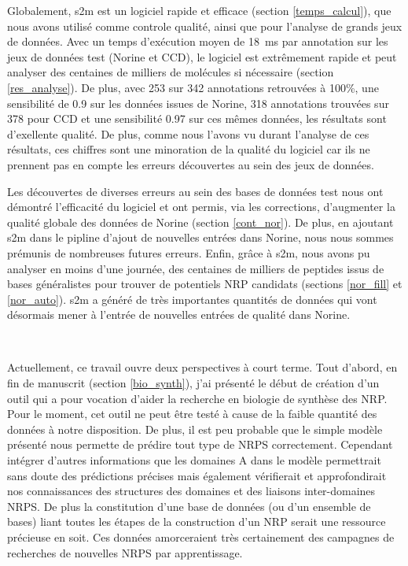 Globalement, s2m est un logiciel rapide et efficace (section \ref{temps_calcul}), que nous avons utilisé comme controle qualité, ainsi que pour l'analyse de grands jeux de données.
Avec un temps d'exécution moyen de 18~ms par annotation sur les jeux de données test (Norine et CCD), le logiciel est extrêmement rapide et peut analyser des centaines de milliers de molécules si nécessaire (section \ref{res_analyse}).
De plus, avec 253 sur 342 annotations retrouvées à 100\%, une sensibilité de 0.9 sur les données issues de Norine, 318 annotations trouvées sur 378 pour CCD et une sensibilité 0.97 sur ces mêmes données, les résultats sont d'exellente qualité.
De plus, comme nous l'avons vu durant l'analyse de ces résultats, ces chiffres sont une minoration de la qualité du logiciel car ils ne prennent pas en compte les erreurs découvertes au sein des jeux de données.

Les découvertes de diverses erreurs au sein des bases de données test nous ont démontré l'efficacité du logiciel et ont permis, via les corrections, d'augmenter la qualité globale des données de Norine (section \ref{cont_nor}).
De plus, en ajoutant s2m dans le pipline d'ajout de nouvelles entrées dans Norine, nous nous sommes prémunis de nombreuses futures erreurs.
Enfin, grâce à s2m, nous avons pu analyser en moins d'une journée, des centaines de milliers de peptides issus de bases généralistes pour trouver de potentiels NRP candidats (sections \ref{nor_fill} et \ref{nor_auto}).
s2m a généré de très importantes quantités de données qui vont désormais mener à l'entrée de nouvelles entrées de qualité dans Norine.


~~


Actuellement, ce travail ouvre deux perspectives à court terme.
Tout d'abord, en fin de manuscrit (section \ref{bio_synth}), j'ai présenté le début de création d'un outil qui a pour vocation d'aider la recherche en biologie de synthèse des NRP.
Pour le moment, cet outil ne peut être testé à cause de la faible quantité des données à notre disposition.
De plus, il est peu probable que le simple modèle présenté nous permette de prédire tout type de NRPS correctement.
Cependant intégrer d'autres informations que les domaines A dans le modèle permettrait sans doute des prédictions précises mais également vérifierait et approfondirait nos connaissances des structures des domaines et des liaisons inter-domaines NRPS.
De plus la constitution d'une base de données (ou d'un ensemble de bases) liant toutes les étapes de la construction d'un NRP serait une ressource précieuse en soit.
Ces données amorceraient très certainement des campagnes de recherches de nouvelles NRPS par apprentissage.

